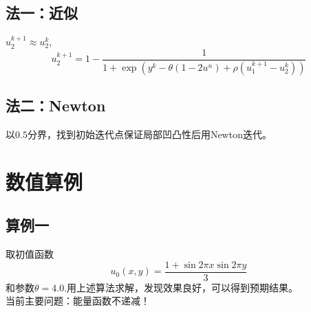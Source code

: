 \documentclass[11pt,a4 paper,one side]{article}
\begin{document}
\subsection{法一：近似}
$u_2^{k+1} \approx u_2^k$,\begin{equation}
    u_2^{k+1} = 1 - \frac{1}{1+\exp{ (y^k-\theta (1-2u^n)+\rho (u_1^{k+1}-u_2^k))}}
\end{equation}
\subsection{法二：Newton}
以$0.5$分界，找到初始迭代点保证局部凹凸性后用Newton迭代。
\section{数值算例}
\subsection{算例一}取初值函数\begin{equation}
u_0(x,y)=\frac{1+\sin{2\pi x}\sin {2\pi y}}{3}
\end{equation}
和参数$\theta = 4.0$.用上述算法求解，发现效果良好，可以得到预期结果。
\\当前主要问题：能量函数不递减！
\end{document}
